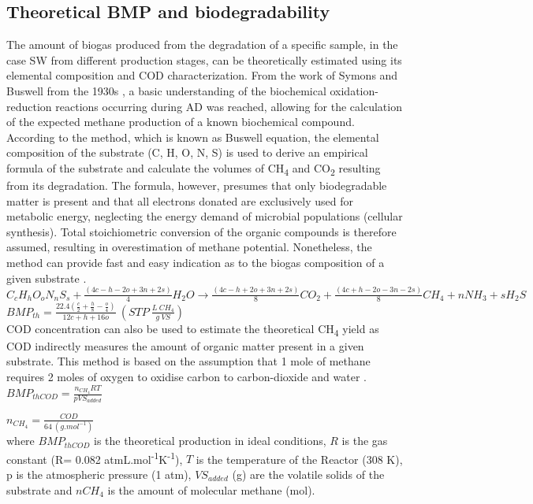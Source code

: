 \subsection{Theoretical BMP and biodegradability}
The amount of biogas produced from the degradation of a specific sample, in the case SW from different production stages, can be theoretically estimated using its elemental composition and COD characterization. From the work of Symons and Buswell from the 1930s \cite{Symons_1933}, a basic understanding of the biochemical oxidation-reduction reactions occurring during AD was reached, allowing for the calculation of the expected methane production of a known biochemical compound. According to the method, which is known as Buswell equation, the elemental composition of the substrate (C, H, O, N, S) is used to derive an empirical formula of the substrate and calculate the volumes of CH\textsubscript{4} and CO\textsubscript{2} resulting from its degradation. The formula, however, presumes that only biodegradable matter is present and that all electrons donated are exclusively used for metabolic energy, neglecting the energy demand of microbial populations (cellular synthesis)\cite{Labatut_2011,Lesteur_2010}. Total stoichiometric conversion of the organic compounds is therefore assumed, resulting in overestimation of methane potential. Nonetheless, the method can provide fast and easy indication as to the biogas composition of a given substrate \cite{Ware_2016}.\\

\(C_cH_hO_oN_nS_s+\frac{(4c-h-2o+3n+2s)}{4}H_2O→\frac{(4c-h+2o+3n+2s)}{8}CO_2+\frac{(4c+h-2o-3n-2s)}{8}CH_4+nNH_3+sH_2S\)\\

\(BMP_{th}=\frac{22.4\left(\frac{c}{2}+\frac{h}{8}-\frac{o}{4}\right)}{12c+h+16o}\ \left(STP\ \frac{L\ CH_4}{g\ VS}\right)\)\\

COD concentration can also be used to estimate the theoretical CH\textsubscript{4} yield as COD indirectly measures the amount of organic matter present in a given substrate. This method is based on the assumption that 1 mole of methane requires 2 moles of oxygen to oxidise carbon to carbon-dioxide and water \cite{Jingura_2017,Nielfa_2015}. 
\\
\(BMP_{thCOD}=\frac{n_{CH_4}RT}{pVS_{added}}\)

\(n_{CH_4}=\frac{COD}{64\ \left(g.mol^{-1}\right)}\)
\\
where $BMP_{thCOD}$ is the theoretical production in ideal conditions, $R$ is the gas constant (R= 0.082 atmL.mol\textsuperscript{-1}K\textsuperscript{-1}), $T$ is the temperature of the Reactor (308 K), p is the atmospheric pressure (1 atm), $VS_{added}$ (g) are the volatile solids of the substrate and $nCH_4$ is the amount of molecular methane (mol).

